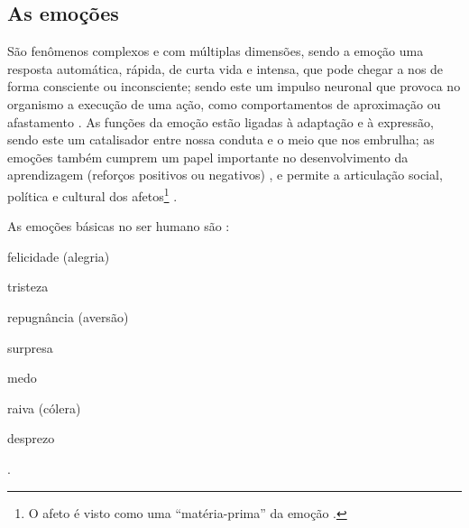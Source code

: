 \subsection{As emoções} 
\label{subsec:emotion}
São fenômenos complexos e com múltiplas dimensões,
sendo a emoção uma resposta automática, rápida, de curta vida e intensa, 
que pode chegar a nos de forma consciente ou inconsciente;
sendo este um impulso neuronal que provoca no organismo a execução de uma ação,
como comportamentos de aproximação ou afastamento
\cite[pp. 288]{zanelli2014psicologia}  \cite{freitas2015codigo}.
As funções da emoção estão ligadas à adaptação e à expressão, 
sendo este um catalisador entre nossa conduta e o meio que nos embrulha;
as emoções também cumprem um papel importante no desenvolvimento da aprendizagem 
(reforços positivos ou negativos)
  \cite{freitas2015codigo},
e permite a articulação social, política e cultural dos afetos\footnote{O 
afeto é visto como uma ``matéria-prima'' da emoção \cite[pp. 43]{hofman2015affective}.} 
\cite[pp. 43]{hofman2015affective}.

As emoções básicas no ser humano são \cite{freitas2015codigo} \cite[pp. 291]{zanelli2014psicologia}:
\begin{inparaitem}
\item felicidade (alegria)  %
\item tristeza              %
\item repugnância (aversão) %
\item surpresa              %
\item medo                  %
\item raiva (cólera)        %
\item desprezo              %
\end{inparaitem}.

